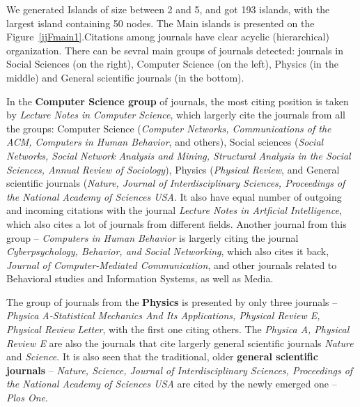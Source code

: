 \documentclass[11pt]{article} %
\begin{document}
We generated Islands of size between 2 and 5, and got 193 islands, with the largest island containing 50 nodes. The Main islands is presented on the Figure~\ref{jjFmain1}.Citations among journals have clear acyclic (hierarchical) organization. There can be sevral main groups of journals detected: journals in Social Sciences (on the right), Computer Science (on the left), Physics (in the middle) and General scientific journals (in the bottom).  \medskip 

In the \textbf{Computer Science group} of journals, the most citing position is taken by \textit{Lecture Notes in Computer Science}, which largerly cite the journals from all the groups: Computer Science (\textit{Computer Networks, Communications of the ACM, Computers in Human Behavior}, and others), Social sciences (\textit{Social Networks, Social Network Analysis and Mining, Structural Analysis in the Social Sciences, Annual Review of Sociology}), Physics (\textit{Physical Review}, and General scientific journals (\textit{Nature, Journal of Interdisciplinary Sciences, Proceedings of the National Academy of Sciences USA}. It also have equal number of outgoing and incoming citations with the journal \textit{Lecture Notes in Artficial Intelligence}, which also cites a lot of journals from different fields. Another journal from this group -- \textit{Computers in Human Behavior} is largerly citing the journal \textit{Cyberpsychology, Behavior, and Social Networking}, which also cites it back, \textit{Journal of Computer-Mediated Communication}, and other journals related to Behavioral studies and Information Systems, as well as Media. \medskip 

The group of journals from the \textbf{Physics} is presented by only three journals -- \textit{Physica A-Statistical Mechanics And Its Applications, Physical Review E, Physical Review Letter}, with the first one citing others. The \textit{Physica A, Physical Review E} are also the journals that cite largerly general scientific journals \textit{Nature} and \textit{Science}. It is also seen that the traditional, older \textbf{general scientific journals} -- \textit{Nature, Science, Journal of Interdisciplinary Sciences, Proceedings of the National Academy of Sciences USA} are cited by the newly emerged one -- \textit{Plos One}. \medskip  
\end{document}
